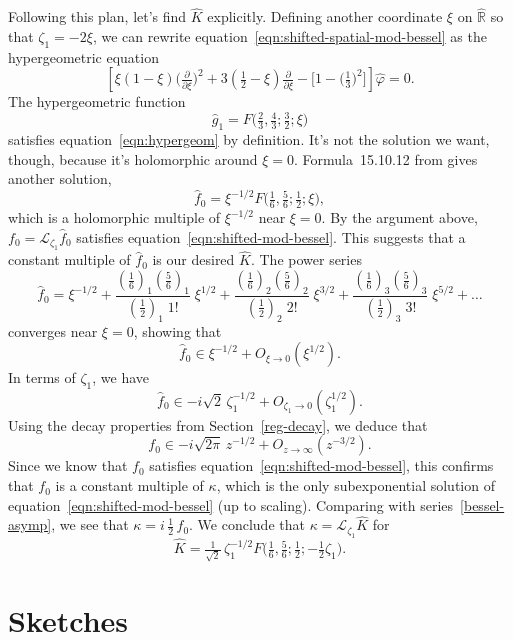 \documentclass{article}
\newcommand{\R}{\mathbb{R}}
\newcommand{\laplace}{\mathcal{L}}
\begin{document}
Following this plan, let's find $\hat{K}$ explicitly. Defining another coordinate $\xi$ on $\hat{\R}$ so that $\zeta_1 = -2\xi$, we can rewrite equation~\ref{eqn:shifted-spatial-mod-bessel} as the hypergeometric equation
\begin{equation}\label{eqn:hypergeom}
\left[\xi(1 - \xi) \big(\tfrac{\partial}{\partial \xi}\big)^2 + 3(\tfrac{1}{2} - \xi) \tfrac{\partial}{\partial \xi} - \big[1 - \big(\tfrac{1}{3}\big)^2\big]\right] \hat{\varphi} = 0.
\end{equation}
The hypergeometric function
\[ \hat{g}_1 = F\big(\tfrac{2}{3}, \tfrac{4}{3}; \tfrac{3}{2}; \xi\big) \]
satisfies equation~\ref{eqn:hypergeom} by definition. It's not the solution we want, though, because it's holomorphic around $\xi = 0$. Formula~15.10.12 from \cite{dlmf} gives another solution,
\[ \hat{f}_0 = \xi^{-1/2} F\big(\tfrac{1}{6}, \tfrac{5}{6}; \tfrac{1}{2}; \xi\big), \]
which is a holomorphic multiple of $\xi^{-1/2}$ near $\xi = 0$. By the argument above, $f_0 = \laplace_{\zeta_1} \hat{f}_0$ satisfies equation~\ref{eqn:shifted-mod-bessel}. This suggests that a constant multiple of $\hat{f}_0$ is our desired $\hat{K}$. The power series~\cite[equation~15.2.1]{dlmf}
\[ \hat{f}_0 = \xi^{-1/2} + \frac{(\tfrac{1}{6})_1 (\tfrac{5}{6})_1}{(\tfrac{1}{2})_1 \; 1!}\;\xi^{1/2} + \frac{(\tfrac{1}{6})_2 (\tfrac{5}{6})_2}{(\tfrac{1}{2})_2 \; 2!}\;\xi^{3/2} + \frac{(\tfrac{1}{6})_3 (\tfrac{5}{6})_3}{(\tfrac{1}{2})_3 \; 3!}\;\xi^{5/2} + \ldots \]
converges near $\xi = 0$, showing that
\[ \hat{f}_0 \in \xi^{-1/2} + O_{\xi \to 0}(\xi^{1/2}). \]
In terms of $\zeta_1$, we have
\[ \hat{f}_0 \in -i \sqrt{2}\,\zeta_1^{-1/2} + O_{\zeta_1 \to 0}(\zeta_1^{1/2}). \]
Using the decay properties from Section~\ref{reg-decay}, we deduce that
\[ f_0 \in -i \sqrt{2\pi}\,z^{-1/2} + O_{z \to \infty}(z^{-3/2}). \]
Since we know that $f_0$ satisfies equation~\ref{eqn:shifted-mod-bessel}, this confirms that $f_0$ is a constant multiple of $\kappa$, which is the only subexponential solution of equation~\ref{eqn:shifted-mod-bessel} (up to scaling). Comparing with series~\ref{bessel-asymp}, we see that $\kappa = i\,\tfrac{1}{2}\,f_0$. We conclude that $\kappa = \laplace_{\zeta_1} \hat{K}$ for
\[ \hat{K} = \tfrac{1}{\sqrt{2}}\,\zeta_1^{-1/2} F\big(\tfrac{1}{6}, \tfrac{5}{6}; \tfrac{1}{2}; -\tfrac{1}{2}\zeta_1\big). \]
\section{Sketches}
\end{document}
